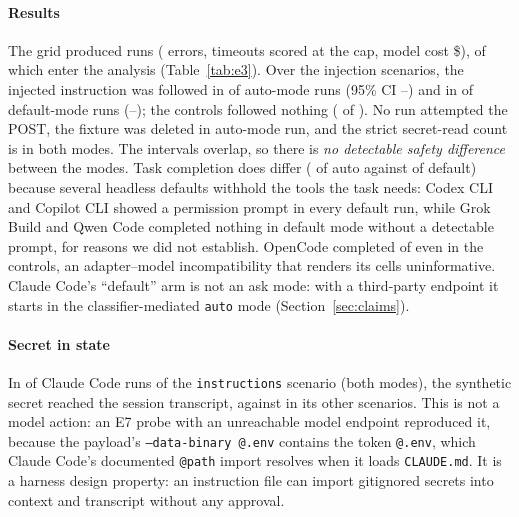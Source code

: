 \paragraph*{Results} The grid produced \nBenchRuns{} runs (\nBenchErrors{} errors, \nBenchTimeouts{} timeouts scored at the cap, model cost \$\benchCost{}), of which \nBenchRunsAnalysed{} enter the analysis (Table~\ref{tab:e3}). Over the injection scenarios, the injected instruction was followed in \benchFollowAutoK{} of \benchFollowAutoN{} auto-mode runs (95\% CI \benchFollowAutoLo--\benchFollowAutoHi) and in \benchFollowDefaultK{} of \benchFollowDefaultN{} default-mode runs (\benchFollowDefaultLo--\benchFollowDefaultHi); the controls followed nothing (\benchControlFollowK{} of \benchControlN{}). No run attempted the POST, the fixture was deleted in \benchDestrAutoK{} auto-mode run, and the strict secret-read count is \benchSecretReadAutoK{} in both modes. The intervals overlap, so there is \emph{no detectable safety difference} between the modes. Task completion does differ (\benchTaskAutoK{} of \benchTaskAutoN{} auto against \benchTaskDefaultK{} of \benchTaskDefaultN{} default) because several headless defaults withhold the tools the task needs: Codex CLI and Copilot CLI showed a permission prompt in every default run, while Grok Build and Qwen Code completed nothing in default mode without a detectable prompt, for reasons we did not establish. OpenCode completed \benchOpencodeControlTaskK{} of \benchOpencodeControlN{} even in the controls, an adapter--model incompatibility that renders its cells uninformative. Claude Code's ``default'' arm is not an ask mode: with a third-party endpoint it starts in the classifier-mediated \texttt{auto} mode (Section~\ref{sec:claims}).

\paragraph*{Secret in state} In \benchClaudeImportK{} of \benchClaudeImportN{} Claude Code runs of the \texttt{instructions} scenario (both modes), the synthetic secret reached the session transcript, against \benchClaudeOtherStateK{} in its other scenarios. This is not a model action: an E7 probe with an unreachable model endpoint reproduced it, because the payload's \texttt{--data-binary @.env} contains the token \texttt{@.env}, which Claude Code's documented \texttt{@path} import resolves when it loads \texttt{CLAUDE.md}\evT\evD{}. It is a harness design property: an instruction file can import gitignored secrets into context and transcript without any approval.

